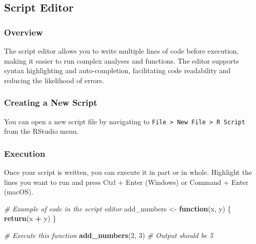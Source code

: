 \documentclass[
  b5paper]{book}
\newenvironment{Shaded}{\begin{snugshade}}{\end{snugshade}}
\newcommand{\CommentTok}[1]{\textcolor[rgb]{0.56,0.35,0.01}{\textit{#1}}}
\newcommand{\ControlFlowTok}[1]{\textcolor[rgb]{0.13,0.29,0.53}{\textbf{#1}}}
\newcommand{\DecValTok}[1]{\textcolor[rgb]{0.00,0.00,0.81}{#1}}
\newcommand{\FunctionTok}[1]{\textcolor[rgb]{0.13,0.29,0.53}{\textbf{#1}}}
\newcommand{\NormalTok}[1]{#1}
\newcommand{\OtherTok}[1]{\textcolor[rgb]{0.56,0.35,0.01}{#1}}
\newcommand{\SpecialCharTok}[1]{\textcolor[rgb]{0.81,0.36,0.00}{\textbf{#1}}}
\begin{document}
\hypertarget{script-editor}{%
\subsection*{Script Editor}\label{script-editor}}

\hypertarget{overview}{%
\subsubsection*{Overview}\label{overview}}

The script editor allows you to write multiple lines of code before execution, making it easier to run complex analyses and functions. The editor supports syntax highlighting and auto-completion, facilitating code readability and reducing the likelihood of errors.

\hypertarget{creating-a-new-script}{%
\subsubsection*{Creating a New Script}\label{creating-a-new-script}}

You can open a new script file by navigating to \texttt{File\ \textgreater{}\ New\ File\ \textgreater{}\ R\ Script} from the RStudio menu.

\hypertarget{execution}{%
\subsubsection*{Execution}\label{execution}}

Once your script is written, you can execute it in part or in whole. Highlight the lines you want to run and press Ctrl + Enter (Windows) or Command + Enter (macOS).

\begin{Shaded}
\begin{Highlighting}[]
\CommentTok{\# Example of code in the script editor}
\NormalTok{add\_numbers }\OtherTok{\textless{}{-}} \ControlFlowTok{function}\NormalTok{(x, y) \{}
  \FunctionTok{return}\NormalTok{(x }\SpecialCharTok{+}\NormalTok{ y)}
\NormalTok{\}}

\CommentTok{\# Execute this function}
\FunctionTok{add\_numbers}\NormalTok{(}\DecValTok{2}\NormalTok{, }\DecValTok{3}\NormalTok{)  }\CommentTok{\# Output should be 5}
\end{Highlighting}
\end{Shaded}
\end{document}
